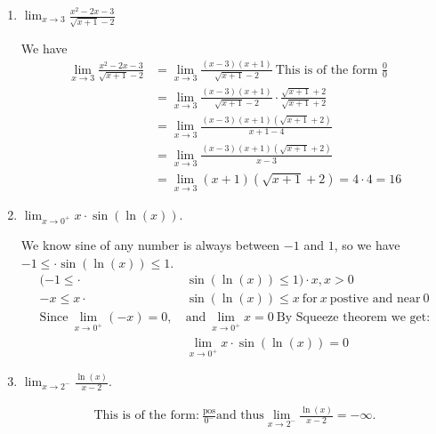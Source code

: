\documentclass[nooutcomes,handout]{ximera}
\begin{document}
\begin{problem}
	\begin{enumerate}
  \item
      $\displaystyle \lim_{x \to 3} \frac{x^2 - 2x - 3}{\sqrt{x+1} - 2}$
      \begin{freeResponse}
        We have
        \begin{align*}
          \lim_{x \to 3} \frac{x^2 - 2x - 3}{\sqrt{x+1} - 2} &= \lim_{x \to 3} \frac{(x- 3)(x + 1)}{\sqrt{x+1} - 2}\ \text{This is of the form $\frac{0}{0}$} \\
          &= \lim_{x \to 3} \frac{(x- 3)(x + 1)}{\sqrt{x+1} - 2} \cdot \frac{\sqrt{x+1} + 2}{\sqrt{x+1} + 2}\\
          &= \lim_{x \to 3} \frac{(x- 3)(x + 1)(\sqrt{x+1} + 2)}{x+1 - 4}\\
          &= \lim_{x \to 3} \frac{(x- 3)(x + 1)(\sqrt{x+1} + 2)}{x-3}\\
          &= \lim_{x \to 3} (x + 1)(\sqrt{x+1} + 2) = 4 \cdot 4 = 16
        \end{align*}
      \end{freeResponse}


    \item
      $\displaystyle \lim_{x \to 0^+} x \cdot \sin(\ln(x))$.
      \begin{freeResponse}
	We know sine of any number is always between $-1$ and $1$, so we have $-1 \le  \cdot \sin(\ln(x)) \le 1$.
	\begin{align*}
	(-1 \le  \cdot& \sin(\ln(x)) \le 1) \cdot x, x>0\\
       	-x \le x \cdot& \sin(\ln(x)) \le x\ \text{for}\ x\ \text{postive and near}\ 0\\
	\text{Since}\ \lim_{x \to 0^+} (-x) = 0,\ &\text{and}\ \lim_{x \to 0^+} x = 0\ \text{By Squeeze theorem we get:}\\
          &\lim_{x \to 0^+} x \cdot \sin(\ln(x)) = 0
 		\end{align*}
      \end{freeResponse}


    \item
      $\displaystyle \lim_{x \to 2^-} \frac{\ln(x)}{x - 2}$.
      \begin{freeResponse}
       
        \begin{align*}
        	\text{This is of the form:}\ \frac{\text{pos}}{0^-} \text{and thus} \lim_{x \to 2^-} \frac{\ln(x)}{x - 2} = -\infty.
        \end{align*}
      \end{freeResponse}
  \end{enumerate} 
\end{problem}
\end{document}
